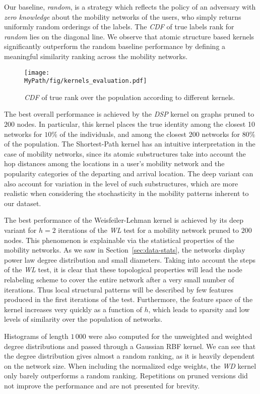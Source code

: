 Our baseline, \emph{random}, is a strategy which reflects the policy of an adversary with \emph{zero knowledge} about the mobility networks of the users, who simply returns uniformly random orderings of the labels.
The \emph{CDF} of true labels rank for \emph{random}  lies on the diagonal line.
We observe that atomic structure based kernels significantly outperform the random baseline performance by defining a meaningful similarity ranking across the mobility networks.

\begin{figure}[!t]
	\centering
	\texttt{[image: \\MyPath/fig/kernels\_evaluation.pdf]}
	\caption{\emph{CDF} of true rank over the population according to different kernels.}
	\label{fig:kernels_evaluation}
\end{figure}

The best overall performance is achieved by the \emph{DSP} kernel on graphs pruned to $ 200 $ nodes.
In particular, this kernel places the true identity among the closest 10 networks for $10\%$ of the individuals, and among the closest $ 200 $ networks for $ 80\%$ of the population.
The Shortest-Path kernel has an intuitive interpretation in the case of mobility networks, since its atomic substructures take into account the hop distances among the locations in a user's mobility network and the popularity categories of the departing and arrival location.
The deep variant can also account for variation in the level of such substructures, which are more realistic when considering the stochasticity in the mobility patterns inherent to our dataset.

The best performance of the Weisfeiler-Lehman kernel is achieved by its deep variant for $ h=2 $ iterations of the \emph{WL} test for a mobility network pruned to $200$ nodes.
This phenomenon is explainable via the statistical properties of the mobility networks.
As we saw in Section~\ref{sec:data-stats}, the networks display power law degree distribution and small diameters.
Taking into account the steps of the \emph{WL} test, it is clear that these topological properties will lead the node relabeling scheme to cover the entire network after a very small number of iterations.
Thus local structural patterns will be described by few features produced in the first iterations of the test.
Furthermore, the feature space of the kernel increases very quickly as a function of $ h $, which leads to sparsity and low levels of similarity over the population of networks.

Histograms of length $1\,000$ were also computed for the unweighted and weighted degree distributions and passed through a Gaussian RBF kernel.
We can see that the degree distribution gives almost a random ranking, as it is heavily dependent on the network size.
When including the normalized edge weights, the \emph{WD} kernel only barely outperforms a rand\label{key}om ranking.
Repetitions on pruned versions did not improve the performance and are not presented for brevity.

